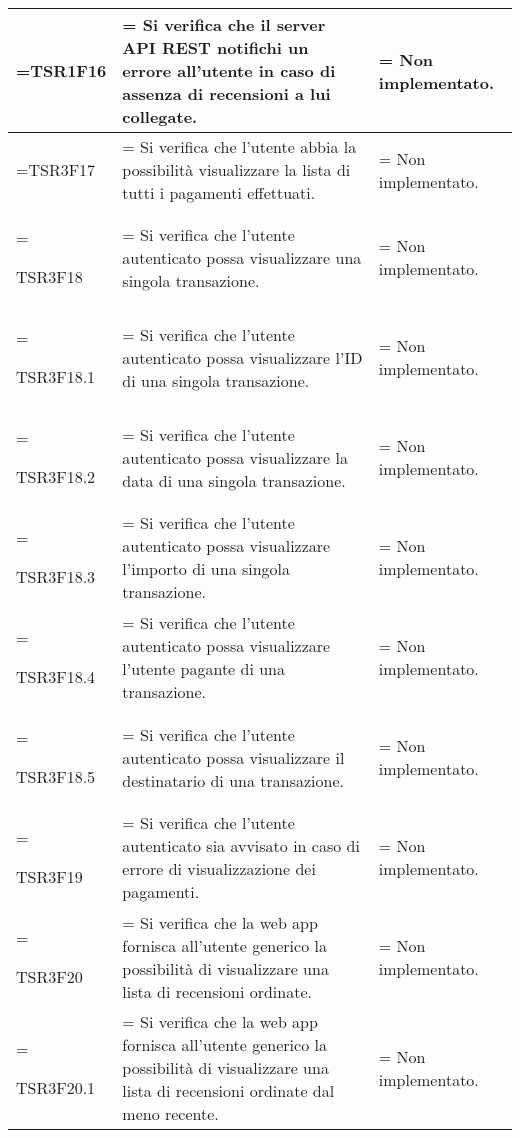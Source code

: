 \begin{xltabular}{\textwidth} {
            >{\hsize\linewidth=\hsize}X
            >{\hsize\linewidth=\hsize}X
            >{\hsize\linewidth=\hsize}X
        }
        TSR1F16 &
        Si verifica che il server API REST notifichi un errore all'utente in caso di assenza di recensioni a lui collegate. &
        Non implementato.
        \\ \hline


        TSR3F17 &
        Si verifica che l'utente abbia la possibilità visualizzare la lista di tutti i pagamenti
        effettuati. &
        Non implementato.
        \\ \hline

        TSR3F18 &
        Si verifica che l'utente autenticato possa visualizzare una singola transazione. &
        Non implementato.
        \\ \hline

        TSR3F18.1 &
        Si verifica che l'utente autenticato possa visualizzare l'ID di una singola transazione. &
        Non implementato.
        \\ \hline


        TSR3F18.2 &
        Si verifica che l'utente autenticato possa visualizzare la data di una singola transazione. &
        Non implementato.
        \\ \hline

        TSR3F18.3 &
        Si verifica che l'utente autenticato possa visualizzare l'importo di una singola transazione. &
        Non implementato.
        \\ \hline

        TSR3F18.4 &
        Si verifica che l'utente autenticato possa visualizzare l'utente pagante di una transazione. &
        Non implementato.
        \\ \hline

        TSR3F18.5 &
        Si verifica che l'utente autenticato possa visualizzare il destinatario di una transazione. &
        Non implementato.
        \\ \hline

        TSR3F19 &
        Si verifica che l'utente autenticato sia avvisato in caso di errore di visualizzazione dei pagamenti. &
        Non implementato.
        \\ \hline

        TSR3F20 &
        Si verifica che la web app fornisca all'utente generico la possibilità di visualizzare una lista di recensioni ordinate. &
        Non implementato. 
        \\ \hline

        TSR3F20.1 &
        Si verifica che la web app fornisca all'utente generico la possibilità di visualizzare una lista di recensioni ordinate dal meno recente. &
        Non implementato. 
        \\ \hline


\end{xltabular}
